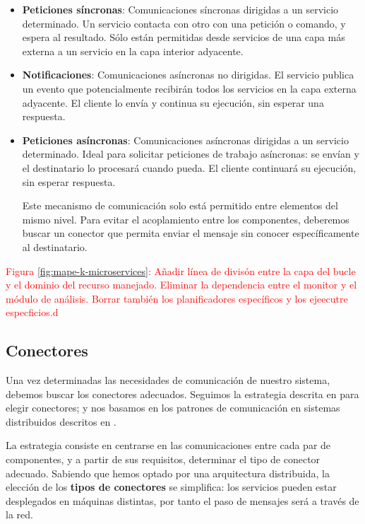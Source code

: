 \begin{itemize}
  \item \textbf{Peticiones síncronas}: Comunicaciones síncronas dirigidas a un servicio determinado. Un servicio contacta con otro con una petición o comando, y espera al resultado. Sólo están permitidas desde servicios de una capa más externa a un servicio en la capa interior adyacente.

  \item \textbf{Notificaciones}: Comunicaciones asíncronas no dirigidas. El servicio publica un evento que potencialmente recibirán todos los servicios en la capa externa adyacente. El cliente lo envía y continua su ejecución, sin esperar una respuesta.

  \item \textbf{Peticiones asíncronas}: Comunicaciones asíncronas dirigidas a un servicio determinado. Ideal para solicitar peticiones de trabajo asíncronas: se envían y el destinatario lo procesará cuando pueda. El cliente continuará su ejecución, sin esperar respuesta.

  Este mecanismo de comunicación solo está permitido entre elementos del mismo nivel. Para evitar el acoplamiento entre los componentes, deberemos buscar un conector que permita enviar el mensaje sin conocer específicamente al destinatario.

\end{itemize}


\textcolor{red}{Figura \ref{fig:mape-k-microservices}: Añadir línea de divisón entre la capa del bucle y el dominio del recurso manejado. Eliminar la dependencia entre el monitor y el módulo de análisis. Borrar también los planificadores específicos y los ejeecutre especficios.d}

\subsection{Conectores}

Una vez determinadas las necesidades de comunicación de nuestro sistema, debemos buscar los conectores adecuados. Seguimos la estrategia descrita en \cite{taylorSoftwareArchitectureFoundations2009} para elegir conectores; y nos basamos en los patrones de comunicación en sistemas distribuidos descritos en \cite{newmanBuildingMicroservicesDesigning2021}.

La estrategia consiste en centrarse en las comunicaciones entre cada par de componentes, y a partir de sus requisitos, determinar el tipo de conector adecuado. Sabiendo que hemos optado por una arquitectura distribuida, la elección de los \textbf{tipos de conectores} se simplifica: los servicios pueden estar desplegados en máquinas distintas, por tanto el paso de mensajes será a través de la red.

